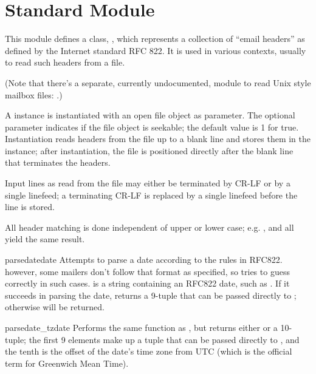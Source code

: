 \section{Standard Module }

\renewcommand{\indexsubitem}{(in module rfc822)}

This module defines a class, , which represents a
collection of ``email headers'' as defined by the Internet standard
RFC 822.  It is used in various contexts, usually to read such headers
from a file.

(Note that there's a separate, currently undocumented, module to read
Unix style mailbox files: .)

A  instance is instantiated with an open file object as
parameter.  The optional  parameter indicates if the
file object is seekable; the default value is 1 for true.
Instantiation reads headers from the file up to a blank line and
stores them in the instance; after instantiation, the file is
positioned directly after the blank line that terminates the headers.

Input lines as read from the file may either be terminated by CR-LF or
by a single linefeed; a terminating CR-LF is replaced by a single
linefeed before the line is stored.

All header matching is done independent of upper or lower case;
e.g. ,  and  all yield
the same result.

\begin{funcdesc}{parsedate}{date}
Attempts to parse a date according to the rules in RFC822.  however,
some mailers don't follow that format as specified, so
 tries to guess correctly in such cases. 
 is a string containing an RFC822 date, such as 
.  If it succeeds in parsing
the date,  returns a 9-tuple that can be passed
directly to ; otherwise  will be
returned.  
\end{funcdesc}

\begin{funcdesc}{parsedate_tz}{date}
Performs the same function as , but returns either
 or a 10-tuple; the first 9 elements make up a tuple that
can be passed directly to , and the tenth is the
offset of the date's time zone from UTC (which is the official term
for Greenwich Mean Time).
\end{funcdesc}

